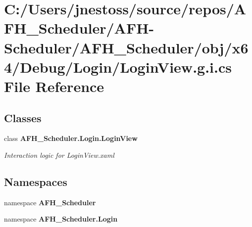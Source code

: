 \section{C\+:/\+Users/jnestoss/source/repos/\+A\+F\+H\+\_\+\+Scheduler/\+A\+F\+H-\/\+Scheduler/\+A\+F\+H\+\_\+\+Scheduler/obj/x64/\+Debug/\+Login/\+Login\+View.g.\+i.\+cs File Reference}
\label{x64_2_debug_2_login_2_login_view_8g_8i_8cs}
\subsection*{Classes}
\begin{DoxyCompactItemize}
\item 
class \textbf{ A\+F\+H\+\_\+\+Scheduler.\+Login.\+Login\+View}
\begin{DoxyCompactList}\small\item\em Interaction logic for Login\+View.\+xaml \end{DoxyCompactList}\end{DoxyCompactItemize}
\subsection*{Namespaces}
\begin{DoxyCompactItemize}
\item 
namespace \textbf{ A\+F\+H\+\_\+\+Scheduler}
\item 
namespace \textbf{ A\+F\+H\+\_\+\+Scheduler.\+Login}
\end{DoxyCompactItemize}
